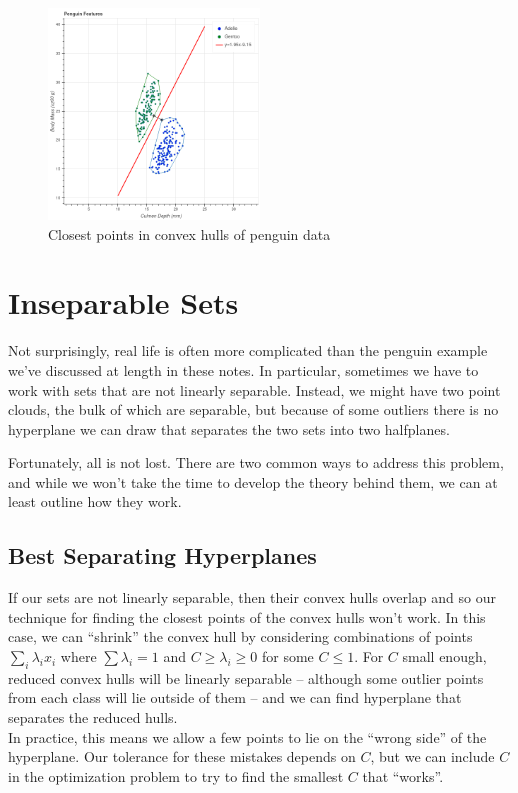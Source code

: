 \documentclass[
  11pt,
  letterpaper,
]{scrbook}
\theoremstyle{plain}
\theoremstyle{plain}
\theoremstyle{remark}
\begin{document}
\begin{figure}

{\centering \includegraphics[width=0.5\textwidth,height=\textheight]{chapters/img/solution.png}

}

\caption{\label{fig-penguinsolution}Closest points in convex hulls of
penguin data}

\end{figure}

\hypertarget{inseparable-sets}{%
\section{Inseparable Sets}\label{inseparable-sets}}

Not surprisingly, real life is often more complicated than the penguin
example we've discussed at length in these notes. In particular,
sometimes we have to work with sets that are not linearly separable.
Instead, we might have two point clouds, the bulk of which are
separable, but because of some outliers there is no hyperplane we can
draw that separates the two sets into two halfplanes.

Fortunately, all is not lost. There are two common ways to address this
problem, and while we won't take the time to develop the theory behind
them, we can at least outline how they work.

\hypertarget{best-separating-hyperplanes}{%
\subsection{Best Separating
Hyperplanes}\label{best-separating-hyperplanes}}

If our sets are not linearly separable, then their convex hulls overlap
and so our technique for finding the closest points of the convex hulls
won't work. In this case, we can ``shrink'' the convex hull by
considering combinations of points \(\sum_{i}\lambda_{i}x_{i}\) where
\(\sum\lambda_{i}=1\) and \(C\ge\lambda_{i}\ge 0\) for some \(C\le 1\).
For \(C\) small enough, reduced convex hulls will be linearly separable
-- although some outlier points from each class will lie outside of them
-- and we can find hyperplane that separates the reduced hulls.\\
In practice, this means we allow a few points to lie on the ``wrong
side'' of the hyperplane. Our tolerance for these mistakes depends on
\(C\), but we can include \(C\) in the optimization problem to try to
find the smallest \(C\) that ``works''.
\end{document}
